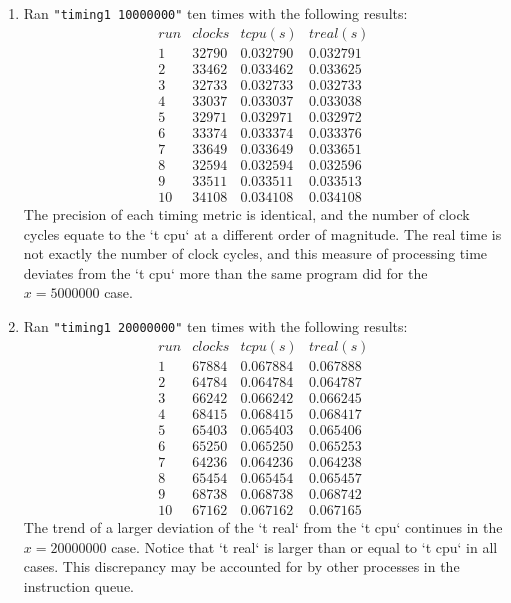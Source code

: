 \documentclass[12pt,fleqn,leqno,letterpaper]{article}
\begin{document}
\begin{enumerate}
    \item Ran \texttt{"timing1 10000000"} ten times with the following
        results:\\
        $$
        \begin{array}{lccc}
            run & clocks & t cpu (s) & t real (s) \\
            1 & 32790 & 0.032790 & 0.032791 \\
            2 & 33462 & 0.033462 & 0.033625 \\
            3 & 32733 & 0.032733 & 0.032733 \\
            4 & 33037 & 0.033037 & 0.033038 \\
            5 & 32971 & 0.032971 & 0.032972 \\
            6 & 33374 & 0.033374 & 0.033376 \\
            7 & 33649 & 0.033649 & 0.033651 \\
            8 & 32594 & 0.032594 & 0.032596 \\
            9 & 33511 & 0.033511 & 0.033513 \\
            10 & 34108 & 0.034108 & 0.034108
        \end{array}
        $$
        The precision of each timing metric is identical, and the number of
        clock cycles equate to the `t cpu` at a different order of magnitude.
        The real time is not exactly the number of clock cycles, and this
        measure of processing time deviates from the `t cpu` more than the same
        program did for the $x=5000000$ case.

    \item Ran \texttt{"timing1 20000000"} ten times with the following
        results:\\
        $$
        \begin{array}{lccc}
            run & clocks & t cpu (s) & t real (s) \\
            1 & 67884 & 0.067884 & 0.067888 \\
            2 & 64784 & 0.064784 & 0.064787 \\
            3 & 66242 & 0.066242 & 0.066245 \\
            4 & 68415 & 0.068415 & 0.068417 \\
            5 & 65403 & 0.065403 & 0.065406 \\
            6 & 65250 & 0.065250 & 0.065253 \\
            7 & 64236 & 0.064236 & 0.064238 \\
            8 & 65454 & 0.065454 & 0.065457 \\
            9 & 68738 & 0.068738 & 0.068742 \\
            10 & 67162 & 0.067162 & 0.067165
        \end{array}
        $$
        The trend of a larger deviation of the `t real` from the `t cpu`
        continues in the $x=20000000$ case. Notice that `t real` is larger than
        or equal to `t cpu` in all cases. This discrepancy may be accounted for
        by other processes in the instruction queue.


\end{enumerate}
\end{document}
